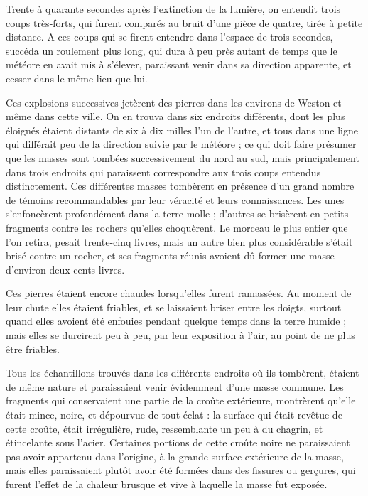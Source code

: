 \documentclass[a4paper, 12pt, oneside, french]{article}
\begin{document}
Trente à quarante secondes après l'extinction de la lumière, on entendit trois coups très-forts, qui furent comparés au bruit d'une pièce de quatre, tirée à petite distance. A ces coups qui se firent entendre dans l'espace de trois secondes, succéda un roulement plus long, qui dura à peu près autant de temps que le météore en avait mis à s'élever, paraissant venir dans sa direction apparente, et cesser dans le même lieu que lui.

Ces explosions successives jetèrent des pierres dans les environs de Weston et même dans cette ville. On en trouva dans six endroits différents, dont les plus éloignés étaient distants de six à dix milles l'un de l'autre, et tous dans une ligne qui différait peu de la direction suivie par le météore ; ce qui doit faire présumer que les masses sont tombées successivement du nord au sud, mais principalement dans trois endroits qui paraissent correspondre aux trois coups entendus distinctement. Ces différentes masses tombèrent en présence d'un grand nombre de témoins recommandables par leur véracité et leurs connaissances. Les unes s'enfoncèrent profondément dans la terre molle ; d'autres se brisèrent en petits fragments contre les rochers qu'elles choquèrent. Le morceau le plus entier que l'on retira, pesait trente-cinq livres, mais un autre bien plus considérable s'était brisé contre un rocher, et ses fragments réunis avoient dû former une masse d'environ deux cents livres.

Ces pierres étaient encore chaudes lorsqu'elles furent ramassées. Au moment de leur chute elles étaient friables, et se laissaient briser entre les doigts, surtout quand elles avoient été enfouies pendant quelque temps dans la terre humide ; mais elles se durcirent peu à peu, par leur exposition à l'air, au point de ne plus être friables.

Tous les échantillons trouvés dans les différents endroits où ils tombèrent, étaient de même nature et paraissaient venir évidemment d'une masse commune. Les fragments qui conservaient une partie de la croûte extérieure, montrèrent qu'elle était mince, noire, et dépourvue de tout éclat : la surface qui était revêtue de cette croûte, était irrégulière, rude, ressemblante un peu à du chagrin, et étincelante sous l'acier. Certaines portions de cette croûte noire ne paraissaient pas avoir appartenu dans l'origine, à la grande surface extérieure de la masse, mais elles paraissaient plutôt avoir été formées dans des fissures ou gerçures, qui furent l'effet de la chaleur brusque et vive à laquelle la masse fut exposée.
\end{document}
